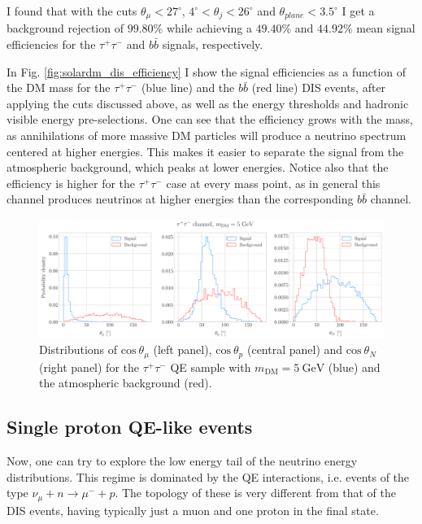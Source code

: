 I found that with the cuts $\theta_{\mu} < 27^{\circ}$, $4^{\circ} < \theta_{j} < 26^{\circ}$ and $\theta_{plane} < 3.5^{\circ}$ I get a background rejection of $99.80\%$ while achieving a $49.40\%$ and $44.92\%$ mean signal efficiencies for the $\tau^{+} \tau^{-}$ and $b\bar{b}$ signals, respectively.

In Fig. \ref{fig:solardm_dis_efficiency} I show the signal efficiencies as a function of the DM mass for the $\tau^{+} \tau^{-}$ (blue line) and the $b\bar{b}$ (red line) DIS events, after applying the cuts discussed above, as well as the energy thresholds and hadronic visible energy pre-selections. One can see that the efficiency grows with the mass, as annihilations of more massive DM particles will produce a neutrino spectrum centered at higher energies. This makes it easier to separate the signal from the atmospheric background, which peaks at lower energies. Notice also that the efficiency is higher for the $\tau^{+} \tau^{-}$ case at every mass point, as in general this channel produces neutrinos at higher energies than the corresponding $b\bar{b}$ channel.

\begin{figure}[t]
	\centering
	\includegraphics[width=0.95\linewidth]{Images/DM_Analysis/solardm_tau_5_qel_angular_dists.pdf}
	\caption[Angular distributions for the $\tau^{+}\tau^{-}$ QE sample with $m_{\mathrm{DM}} = 5 \ \mathrm{GeV}$ and the atmospheric background.]{Distributions of $\mathrm{cos} \ \theta_{\mu}$ (left panel), $\mathrm{cos} \ \theta_{p}$ (central panel) and $\mathrm{cos} \ \theta_{N}$ (right panel) for the $\tau^{+}\tau^{-}$ QE sample with $m_{\mathrm{DM}} = 5 \ \mathrm{GeV}$ (blue) and the atmospheric background (red).}
	\label{fig:solardm_tau_5_qel_angular_dists}
\end{figure}

\subsection{Single proton QE-like events}

Now, one can try to explore the low energy tail of the neutrino energy distributions. This regime is dominated by the QE interactions, i.e. events of the type $\nu_{\mu} + n \rightarrow \mu^{-} + p$. The topology of these is very different from that of the DIS events, having typically just a muon and one proton in the final state.


